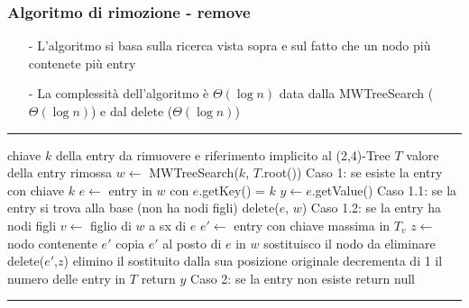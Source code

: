 \documentclass[a4paper]{article}
\makeatletter
\newenvironment{algo}[4]{
	\noindent\rule{\textwidth}{0.4pt}
	\begin{algorithmic}[1]
		\addtocounter{ALG@line}{-1}
		\Procedure{#1}{#2}
		\Require #3
		\Ensure #4
		\Statex }{
		\EndProcedure
	\end{algorithmic}
	\rule{\textwidth}{0.4pt}}
\makeatother
\begin{document}
\subsubsection*{Algoritmo di rimozione - remove}
\begin{itemize}[topsep=3pt, itemsep=0pt]
	\item[-] L'algoritmo si basa sulla ricerca vista sopra e sul fatto che un nodo più contenete più entry
	\item[-] La complessità dell'algoritmo è \(\Theta(\log n)\) data dalla MWTreeSearch (\(\Theta(\log n)\)) e dal delete (\(\Theta(\log n)\))
\end{itemize}
\begin{algo}{remove}{$k$}{chiave $k$ della entry da rimuovere e riferimento implicito al (2,4)-Tree $T$}{valore della entry rimossa}
	\State $w \gets$ MWTreeSearch($k$, $T$.root())
	 \Comment Caso 1: se esiste la entry con chiave $k$
		\State $e \gets $ entry in $w$ con $e$.getKey() = $k$
		\State $y \gets e$.getValue()
		 \Comment Caso 1.1: se la entry si trova alla base (non ha nodi figli)
			\State delete($e$, $w$)
		\Else \Comment Caso 1.2: se la entry ha nodi figli
			\State $v \gets$ figlio di $w$ a sx di $e$
			\State $e' \gets$ entry con chiave massima in $T_v$
			\State $z \gets$ nodo contenente $e'$
			\State copia $e'$ al posto di $e$ in $w$ \Comment sostituisco il nodo da eliminare
			\State delete($e'$,$z$) \Comment elimino il sostituito dalla sua posizione originale
		\EndIf
		\State decrementa di 1 il numero delle entry in $T$
		\State return $y$
	\Else \Comment Caso 2: se la entry non esiste
		\State return null
	\EndIf
\end{algo}

\newpage
\end{document}
